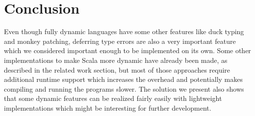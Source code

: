 \section{Conclusion}

Even though fully dynamic languages have some other features like duck typing and monkey patching, deferring type errors are also a very important feature which we considered important enough to be implemented on its own. Some other implementations to make Scala more dynamic have already been made, as described in the related work section, but most of those approaches require additional runtime support which increases the overhead and potentially makes compiling and running the programs slower. The solution we present also shows that some dynamic features can be realized fairly easily with lightweight implementations which might be interesting for further development.

